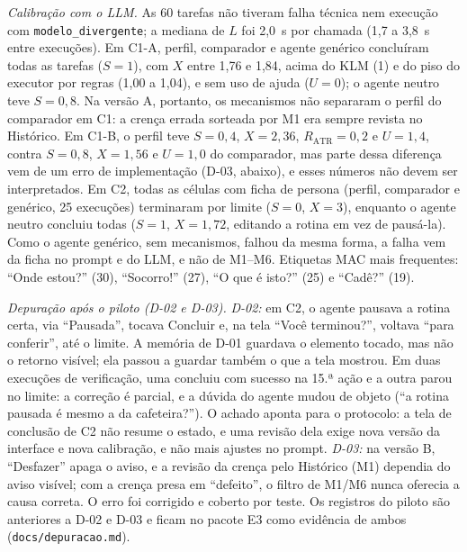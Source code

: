 \documentclass[conference]{IEEEtran}
\begin{document}
\textit{Calibração com o LLM.} As 60 tarefas não tiveram falha técnica nem execução com \texttt{modelo\_divergente}; a mediana de $L$ foi 2,0~s por chamada (1,7 a 3,8~s entre execuções). Em C1-A, perfil, comparador e agente genérico concluíram todas as tarefas ($S=1$), com $X$ entre 1,76 e 1,84, acima do KLM (1) e do piso do executor por regras (1,00 a 1,04), e sem uso de ajuda ($U=0$); o agente neutro teve $S=0{,}8$. Na versão A, portanto, os mecanismos não separaram o perfil do comparador em C1: a crença errada sorteada por M1 era sempre revista no Histórico. Em C1-B, o perfil teve $S=0{,}4$, $X=2{,}36$, $R_{\mathrm{ATR}}=0{,}2$ e $U=1{,}4$, contra $S=0{,}8$, $X=1{,}56$ e $U=1{,}0$ do comparador, mas parte dessa diferença vem de um erro de implementação (D-03, abaixo), e esses números não devem ser interpretados. Em C2, todas as células com ficha de persona (perfil, comparador e genérico, 25 execuções) terminaram por limite ($S=0$, $X=3$), enquanto o agente neutro concluiu todas ($S=1$, $X=1{,}72$, editando a rotina em vez de pausá-la). Como o agente genérico, sem mecanismos, falhou da mesma forma, a falha vem da ficha no prompt e do LLM, e não de M1--M6. Etiquetas MAC mais frequentes: ``Onde estou?'' (30), ``Socorro!'' (27), ``O que é isto?'' (25) e ``Cadê?'' (19).

\textit{Depuração após o piloto (D-02 e D-03).} \textit{D-02:} em C2, o agente pausava a rotina certa, via ``Pausada'', tocava Concluir e, na tela ``Você terminou?'', voltava ``para conferir'', até o limite. A memória de D-01 guardava o elemento tocado, mas não o retorno visível; ela passou a guardar também o que a tela mostrou. Em duas execuções de verificação, uma concluiu com sucesso na 15.ª ação e a outra parou no limite: a correção é parcial, e a dúvida do agente mudou de objeto (``a rotina pausada é mesmo a da cafeteira?''). O achado aponta para o protocolo: a tela de conclusão de C2 não resume o estado, e uma revisão dela exige nova versão da interface e nova calibração, e não mais ajustes no prompt. \textit{D-03:} na versão B, ``Desfazer'' apaga o aviso, e a revisão da crença pelo Histórico (M1) dependia do aviso visível; com a crença presa em ``defeito'', o filtro de M1/M6 nunca oferecia a causa correta. O erro foi corrigido e coberto por teste. Os registros do piloto são anteriores a D-02 e D-03 e ficam no pacote E3 como evidência de ambos (\texttt{docs/depuracao.md}).
\end{document}
